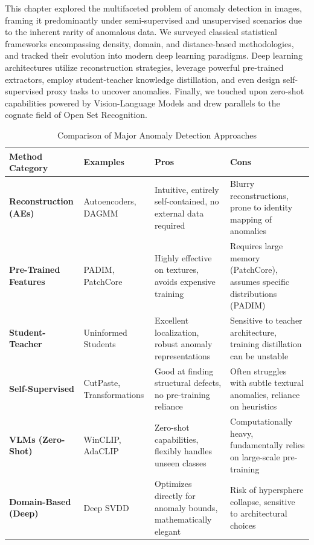 This chapter explored the multifaceted problem of anomaly detection in images, framing it predominantly under semi-supervised and unsupervised scenarios due to the inherent rarity of anomalous data. We surveyed classical statistical frameworks encompassing density, domain, and distance-based methodologies, and tracked their evolution into modern deep learning paradigms. Deep learning architectures utilize reconstruction strategies, leverage powerful pre-trained extractors, employ student-teacher knowledge distillation, and even design self-supervised proxy tasks to uncover anomalies. Finally, we touched upon zero-shot capabilities powered by Vision-Language Models and drew parallels to the cognate field of Open Set Recognition.

\begin{table}[h]
\centering
\begin{tabularx}{\textwidth}{| >{\centering\arraybackslash}m{3.5cm} | X | X | X |}
\hline
\textbf{Method Category} & \textbf{Examples} & \textbf{Pros} & \textbf{Cons} \\
\hline
\textbf{Reconstruction (AEs)} & Autoencoders, DAGMM & Intuitive, entirely self-contained, no external data required & Blurry reconstructions, prone to identity mapping of anomalies \\
\hline
\textbf{Pre-Trained Features} & PADIM, PatchCore & Highly effective on textures, avoids expensive training & Requires large memory (PatchCore), assumes specific distributions (PADIM) \\
\hline
\textbf{Student-Teacher} & Uninformed Students & Excellent localization, robust anomaly representations & Sensitive to teacher architecture, training distillation can be unstable \\
\hline
\textbf{Self-Supervised} & CutPaste, Transformations & Good at finding structural defects, no pre-training reliance & Often struggles with subtle textural anomalies, reliance on heuristics \\
\hline
\textbf{VLMs (Zero-Shot)} & WinCLIP, AdaCLIP & Zero-shot capabilities, flexibly handles unseen classes & Computationally heavy, fundamentally relies on large-scale pre-training \\
\hline
\textbf{Domain-Based (Deep)} & Deep SVDD & Optimizes directly for anomaly bounds, mathematically elegant & Risk of hypersphere collapse, sensitive to architectural choices \\
\hline
\end{tabularx}
\caption{Comparison of Major Anomaly Detection Approaches}
\label{tab:ad_methods}
\end{table}


